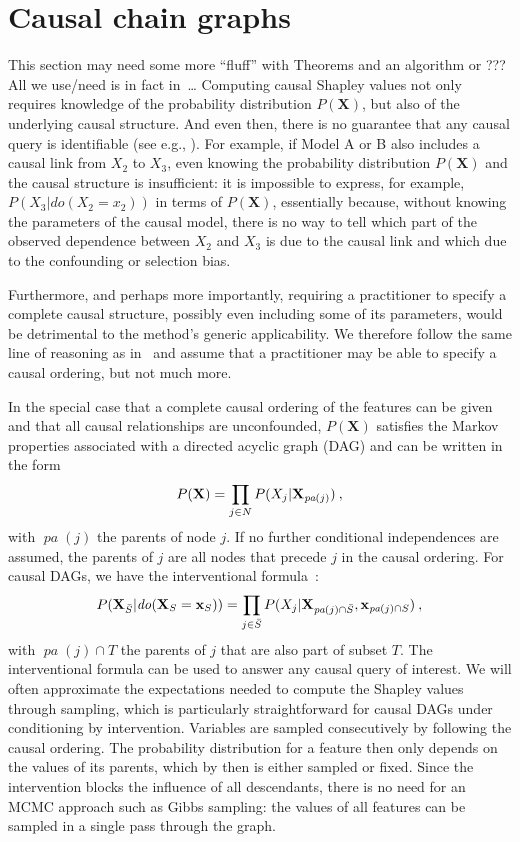 \documentclass{article}
\newcommand{\vX}{\mathbf{X}}
\newcommand{\vx}{\mathbf{x}}
\newcommand{\dodo}{\mathit{do}}
\newcommand{\ldo}[1]{\dodo(X_{#1} = x_{#1})}
\newcommand{\lvdo}[1]{\dodo(\vX_{#1} = \vx_{#1})}
\newcommand{\pa}{\mathop{\textit{pa}}}
\newcommand{\spa}{\mathop{\textit{\scriptsize pa}}}
\newcommand{\allfeatures}{{N}}
\newcommand{\comment}[1]{{\color{red} #1}}
\begin{document}
\section{Causal chain graphs}

\comment{This section may need some more ``fluff'' with Theorems and an algorithm or ??? All we use/need is in fact in~\cite{lauritzen2002chain}\ldots}
Computing causal Shapley values not only requires knowledge of the probability distribution $P(\vX)$, but also of the underlying causal structure. And even then, there is no guarantee that any causal query is identifiable (see e.g., \cite{pearl2012calculus}). For example, if Model A or B also includes a causal link from $X_2$ to $X_3$, even knowing the probability distribution $P(\vX)$ and the causal structure is insufficient: it is impossible to express, for example, $P(X_3|\ldo{2})$ in terms of $P(\vX)$, essentially because, without knowing the parameters of the causal model, there is no way to tell which part of the observed dependence between $X_2$ and $X_3$ is due to the causal link and which due to the confounding or selection bias.

Furthermore, and perhaps more importantly, requiring a practitioner to specify a complete causal structure, possibly even including some of its parameters, would be detrimental to the method's generic applicability. We therefore follow the same line of reasoning as in~\cite{frye2019asymmetric} and assume that a practitioner may be able to specify a causal ordering, but not much more.

In the special case that a complete causal ordering of the features can be given and that all causal relationships are unconfounded, $P(\vX)$ satisfies the Markov properties associated with a directed acyclic graph (DAG) and can be written in the form
\[
P(\vX) = \prod_{j \in \allfeatures} P(X_j|\vX_{\spa(j)}) \: ,
\]
with $\pa(j)$ the parents of node $j$. If no further conditional independences are assumed, the parents of $j$ are all nodes that precede $j$ in the causal ordering. For causal DAGs, we have the interventional formula~\cite{lauritzen2002chain}:
\begin{equation}
P(\vX_{\bar{S}}|\lvdo{S}) = \prod_{j \in \bar{S}} P(X_j|\vX_{\spa(j)  \cap \bar{S}},\vx_{\spa(j) \cap S}) \: ,
\label{eq:interventional}
\end{equation}
with $\pa(j) \cap T$ the parents of $j$ that are also part of subset $T$. The interventional formula can be used to answer any causal query of interest. We will often approximate the expectations needed to compute the Shapley values through sampling, which is particularly straightforward for causal DAGs under conditioning by intervention. Variables are sampled consecutively by following the causal ordering. The probability distribution for a feature then only depends on the values of its parents, which by then is either sampled or fixed. Since the intervention blocks the influence of all descendants, there is no need for an MCMC approach such as Gibbs sampling: the values of all features can be sampled in a single pass through the graph.
\end{document}
